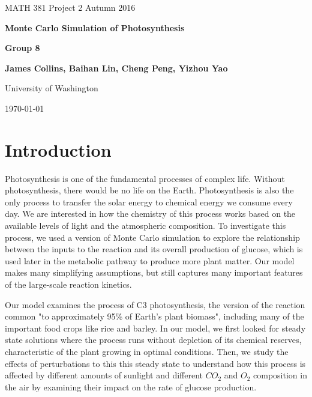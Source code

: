 \documentclass[12pt,reqno]{amsart}
\begin{document}
	\begin{center}
    	{MATH 381 Project 2 Autumn 2016\par}
    	\vspace{3 cm}
	    {\LARGE \bfseries Monte Carlo Simulation of Photosynthesis\par}
	    \vspace{11 cm}
	    {\bfseries Group 8\par}
	    \vspace{0.5 cm}
	    {\bfseries James Collins, Baihan Lin, Cheng Peng, Yizhou Yao\par}
	    \vspace{0.5cm}
	    {University of Washington\par}
	    \vspace{0.5cm}
	    {\today\par}
	\end{center}
	
	\newpage
	
	\section*{\large \textbf{Introduction}}
	
	Photosynthesis is one of the fundamental processes of complex life. 
	Without photosynthesis, there would be no life on the Earth.  
	Photosynthesis is also the only process to transfer the solar 
	energy to chemical energy we consume every day. We are 
	interested in how the chemistry of this process works based on the
	available levels of light and the atmospheric composition. 
	To investigate this process, we used a version of Monte Carlo 
	simulation to explore the relationship between the inputs to the 
	reaction and its overall production of glucose, which is used
	later in the metabolic pathway to produce more plant matter. Our model
	makes many simplifying assumptions, but still captures many important
	features of the large-scale reaction kinetics.
	
	Our model examines the process of C3 photosynthesis, the version
	of the reaction common "to approximately 95\% of Earth's plant 
	biomass"\cite{C3_wiki}, including many of the important food crops
	like rice and barley. In our model, we first looked
	for steady state solutions where the process runs without depletion
	of its chemical reserves, characteristic of the plant growing in 
	optimal conditions. Then, we study the effects of perturbations
	to this this steady state to understand how this process is 
	affected by different amounts of sunlight and different $CO_2$
	and $O_2$ composition in the air by examining their impact on the rate 
	of glucose production.
	
\end{document}
